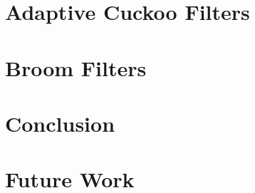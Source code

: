 \documentclass[11pt]{article}
\begin{document}


\section{Adaptive Cuckoo Filters}



\section{Broom Filters}



\section{Conclusion}



\section{Future Work}






\end{document}
